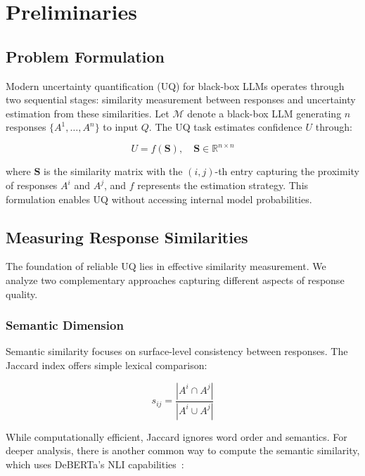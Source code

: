 \section{Preliminaries}
\label{sec:background}

\subsection{Problem Formulation}
\label{subsec:problem}
Modern uncertainty quantification (UQ) for black-box LLMs operates through two sequential stages: similarity measurement between responses and uncertainty estimation from these similarities. Let $\mathcal{M}$ denote a black-box LLM generating $n$ responses $\{A^1,\ldots,A^n\}$ to input $Q$. The UQ task estimates confidence $U $ through:


\begin{equation}
U = f(\mathbf{S}), \quad \mathbf{S} \in \mathbb{R}^{n\times n}
\end{equation}

\noindent where $\mathbf{S}$ is the similarity matrix with the $(i, j)$-th entry capturing the proximity  of responses $A^i$ and $A^j$, and $f$ represents the estimation strategy. This formulation enables UQ without accessing internal model probabilities.

\subsection{Measuring Response Similarities}
\label{subsec:similarities}
The foundation of reliable UQ lies in effective similarity measurement. We analyze two complementary approaches capturing different aspects of response quality.

\subsubsection{Semantic Dimension}
\label{subsubsec:semantic}
Semantic similarity focuses on surface-level consistency between responses. The Jaccard index \citep{lin2023generating} offers simple lexical comparison:

\begin{equation}
s_{ij} = \frac{|A^i \cap A^j|}{|A^i \cup A^j|}
\end{equation}

While computationally efficient, Jaccard ignores word order and semantics. For deeper analysis, there is another common way to compute the semantic similarity, which uses DeBERTa's NLI capabilities~\citep{he2021deberta}:

